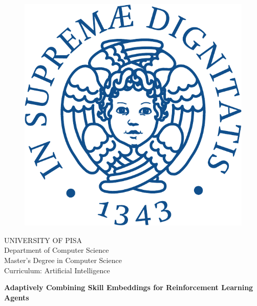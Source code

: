 \begin{titlepage}
\begin{figure}[!htb]
    \centering
    \includegraphics[keepaspectratio=true,scale=0.5]{images/Frontespizio/cherubinFrontespizio-eps-converted-to}
\end{figure}

\begin{center}
    \LARGE{UNIVERSITY OF PISA}
    \vspace{5mm}
    \\ \large{Department of Computer Science}
    \vspace{5mm}
    \\ \LARGE{Master's Degree in Computer Science}
    \\ \LARGE{Curriculum: Artificial Intelligence}
\end{center}


\vspace{7mm}
\begin{center}
    {\LARGE{\textbf{Adaptively Combining Skill Embeddings for Reinforcement Learning Agents} \\ \vspace{5mm}
    }}
    
    

\end{center}
\end{titlepage}
